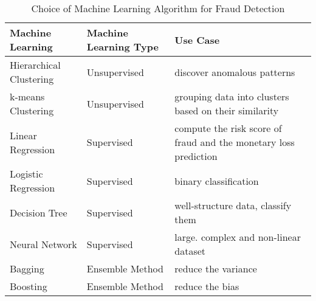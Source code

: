 \documentclass{article}
\begin{document}
        \begin{table}[H]
            \centering
            \bgroup
            \def\arraystretch{1.5}
                \begin{tabularx}{\textwidth}{|>{\centering\arraybackslash}X|>{\centering\arraybackslash}X|>{\centering\arraybackslash}X|}
                     \hline
                     Machine Learning & Machine Learning Type & Use Case \\
                     \hline
                     Hierarchical Clustering & Unsupervised & discover anomalous patterns \\
                     \hline
                     k-means Clustering & Unsupervised & grouping data into clusters based on their similarity \\
                     \hline
                     Linear Regression & Supervised & compute the risk score of fraud and the monetary loss prediction \\
                     \hline
                     Logistic Regression & Supervised & binary classification \\
                     \hline
                     Decision Tree & Supervised & well-structure data, classify them \\
                     \hline
                     Neural Network & Supervised & large. complex and non-linear dataset \\
                     \hline
                     Bagging & Ensemble Method & reduce the variance \\
                     \hline 
                     Boosting & Ensemble Method & reduce the bias \\
                     \hline
                \end{tabularx}
            \egroup
            \caption{Choice of Machine Learning Algorithm for Fraud Detection}
            \label{tab:Choice of Machine Learning Algorithm for Fraud Detection}
        \end{table}


    
    
    
    \printglossaries
    
\end{document}
